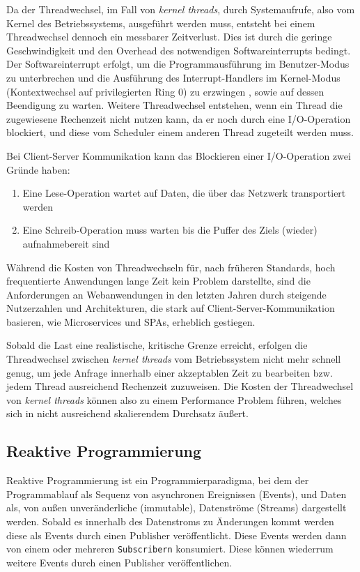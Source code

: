 \noindent
Da der Threadwechsel, im Fall von \textit{kernel threads}, durch Systemaufrufe, also vom Kernel des Betriebssystems, ausgeführt werden muss, entsteht
bei einem Threadwechsel dennoch ein messbarer Zeitverlust.
Dies ist durch die geringe Geschwindigkeit und den Overhead des notwendigen Softwareinterrupts bedingt.
Der Softwareinterrupt erfolgt, um die Programmausführung im Benutzer-Modus zu unterbrechen und die Ausführung des Interrupt-Handlers im
Kernel-Modus (Kontextwechsel auf privilegierten Ring 0) zu erzwingen , sowie auf dessen Beendigung zu warten.
Weitere Threadwechsel entstehen, wenn ein Thread die zugewiesene Rechenzeit nicht nutzen kann, da er noch durch eine I/O-Operation
blockiert, und diese vom Scheduler einem anderen Thread zugeteilt werden muss.

\noindent
Bei Client-Server Kommunikation kann das Blockieren einer I/O-Operation zwei Gründe haben:
\begin{enumerate}
	\item Eine Lese-Operation wartet auf Daten, die über das Netzwerk transportiert werden
	\item Eine Schreib-Operation muss warten bis die Puffer des Ziels (wieder) aufnahmebereit sind
\end{enumerate}

\noindent
Während die Kosten von Threadwechseln für, nach früheren Standards, hoch frequentierte Anwendungen lange Zeit kein Problem darstellte,
sind die Anforderungen an Webanwendungen in den letzten Jahren durch steigende Nutzerzahlen und Architekturen,
die stark auf Client-Server-Kommunikation basieren, wie Microservices und SPAs, erheblich gestiegen.

\noindent
Sobald die Last eine realistische, kritische Grenze erreicht, erfolgen die Threadwechsel zwischen \textit{kernel threads} vom Betriebssystem
nicht mehr schnell genug, um jede Anfrage innerhalb einer akzeptablen Zeit zu bearbeiten bzw. jedem Thread ausreichend Rechenzeit zuzuweisen.
Die Kosten der Threadwechsel von \textit{kernel threads} können also zu einem Performance Problem führen, welches sich in nicht
ausreichend skalierendem Durchsatz äußert.

\subsection{Reaktive Programmierung}
\label{section:reaktive_programmierung}
Reaktive Programmierung ist ein Programmierparadigma, bei dem der Programmablauf als Sequenz von asynchronen Ereignissen (Events), und
Daten als, von außen unveränderliche (immutable), Datenströme (Streams) dargestellt werden.
Sobald es innerhalb des Datenstroms zu Änderungen kommt werden diese als Events durch einen Publisher veröffentlicht.
Diese Events werden dann von einem oder mehreren \verb|Subscribern| konsumiert. Diese können wiederrum weitere Events durch einen Publisher veröffentlichen.

